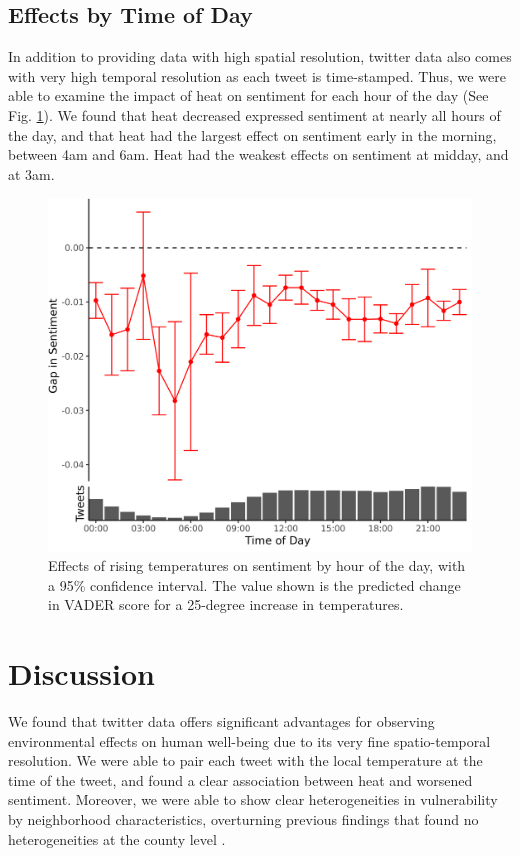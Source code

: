 \documentclass{article}
\begin{document}
\subsection{Effects by Time of Day}

In addition to providing data with high spatial resolution, twitter data also comes with very high temporal resolution as each tweet is time-stamped.  Thus, we were able to examine the impact of heat on sentiment for each hour of the day (See Fig. \ref{fig:ts-wbgt}).  We found that heat decreased expressed sentiment at nearly all hours of the day, and that heat had the largest effect on sentiment early in the morning, between 4am and 6am.  Heat had the weakest effects on sentiment at midday, and at 3am.

\begin{figure}[H]
  \centering
  \includegraphics[width=0.5\linewidth]{../res/ts.png}
  \caption{Effects of rising temperatures on sentiment by hour of the day, with a 95\% confidence interval.  The value shown is the predicted change in VADER score for a 25-degree increase in temperatures.}
  \label{fig:ts-wbgt}
\end{figure}

\section{Discussion}
We found that twitter data offers significant advantages for observing environmental effects on human well-being due to its very fine spatio-temporal resolution.  We were able to pair each tweet with the local temperature at the time of the tweet, and found a clear association between heat and worsened sentiment.   Moreover, we were able to show clear heterogeneities in vulnerability by neighborhood characteristics, overturning previous findings that found no heterogeneities at the county level \cite{Burke2018Aug, Mullins2019Dec}.
\end{document}
